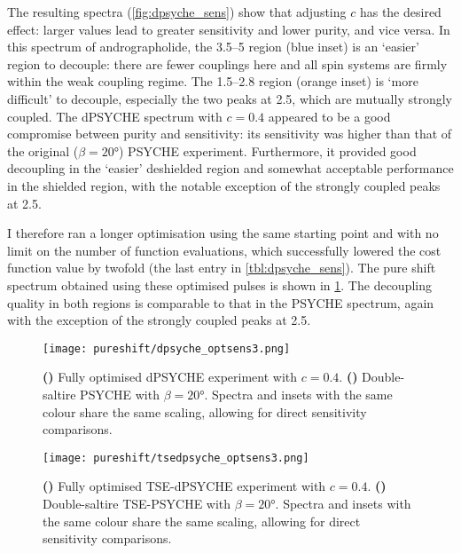 The resulting spectra (\cref{fig:dpsyche_sens}) show that adjusting $c$ has the desired effect: larger values lead to greater sensitivity and lower purity, and vice versa.
In this spectrum of andrographolide, the \qtyrange{3.5}{5}{\ppm} region (blue inset) is an `easier' region to decouple: there are fewer couplings here and all spin systems are firmly within the weak coupling regime.
The \qtyrange{1.5}{2.8}{\ppm} region (orange inset) is `more difficult' to decouple, especially the two peaks at \qty{2.5}{\ppm}, which are mutually strongly coupled.
The dPSYCHE spectrum with $c = 0.4$ appeared to be a good compromise between purity and sensitivity: its sensitivity was higher than that of the original ($\beta = \ang{20}$) PSYCHE experiment.
Furthermore, it provided good decoupling in the `easier' deshielded region and somewhat acceptable performance in the shielded region, with the notable exception of the strongly coupled peaks at \qty{2.5}{\ppm}.

I therefore ran a longer optimisation using the same starting point and with no limit on the number of function evaluations, which successfully lowered the cost function value by twofold (the last entry in \cref{tbl:dpsyche_sens}).
The pure shift spectrum obtained using these optimised pulses is shown in \cref{fig:dpsyche_optsens3}.
The decoupling quality in both regions is comparable to that in the PSYCHE spectrum, again with the exception of the strongly coupled peaks at \qty{2.5}{\ppm}.

\begin{figure}[htb]
    \centering
    \texttt{[image: pureshift/dpsyche\_optsens3.png]}%
    {\label{fig:dpsyche_optsens3_d}}%
    {\label{fig:dpsyche_optsens3_p}}%
    \caption[dPSYCHE final optimisation with $c = 0.4$]{
        \textbf{()} Fully optimised dPSYCHE experiment with $c = 0.4$.
        \textbf{()} Double-saltire PSYCHE with $\beta = \ang{20}$.
        Spectra and insets with the same colour share the same scaling, allowing for direct sensitivity comparisons.
    }
    \label{fig:dpsyche_optsens3}
\end{figure}

\begin{figure}[htb]
    \centering
    \texttt{[image: pureshift/tsedpsyche\_optsens3.png]}%
    {\label{fig:tsedpsyche_optsens3_d}}%
    {\label{fig:tsedpsyche_optsens3_p}}%
    \caption[TSE-dPSYCHE final optimisation with $c = 0.4$]{
        \textbf{()} Fully optimised TSE-dPSYCHE experiment with $c = 0.4$.
        \textbf{()} Double-saltire TSE-PSYCHE with $\beta = \ang{20}$.
        Spectra and insets with the same colour share the same scaling, allowing for direct sensitivity comparisons.
    }
    \label{fig:tsedpsyche_optsens3}
\end{figure}

